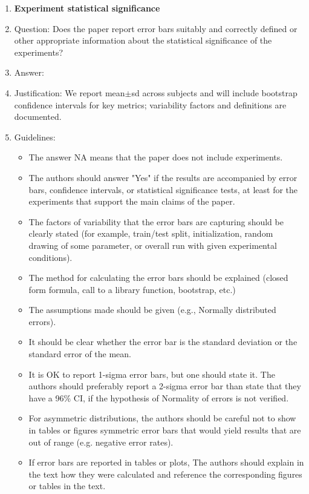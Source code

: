 \documentclass{article}
\begin{document}
\begin{enumerate}
\item {\bf Experiment statistical significance}
    \item[] Question: Does the paper report error bars suitably and correctly defined or other appropriate information about the statistical significance of the experiments?
    \item[] Answer: \answerYes{}
    \item[] Justification: We report mean$\pm$sd across subjects and will include bootstrap confidence intervals for key metrics; variability factors and definitions are documented.
    \item[] Guidelines:
    \begin{itemize}
        \item The answer NA means that the paper does not include experiments.
        \item The authors should answer "Yes" if the results are accompanied by error bars, confidence intervals, or statistical significance tests, at least for the experiments that support the main claims of the paper.
        \item The factors of variability that the error bars are capturing should be clearly stated (for example, train/test split, initialization, random drawing of some parameter, or overall run with given experimental conditions).
        \item The method for calculating the error bars should be explained (closed form formula, call to a library function, bootstrap, etc.)
        \item The assumptions made should be given (e.g., Normally distributed errors).
        \item It should be clear whether the error bar is the standard deviation or the standard error of the mean.
        \item It is OK to report 1-sigma error bars, but one should state it. The authors should preferably report a 2-sigma error bar than state that they have a 96\% CI, if the hypothesis of Normality of errors is not verified.
        \item For asymmetric distributions, the authors should be careful not to show in tables or figures symmetric error bars that would yield results that are out of range (e.g. negative error rates).
        \item If error bars are reported in tables or plots, The authors should explain in the text how they were calculated and reference the corresponding figures or tables in the text.
    \end{itemize}


\end{enumerate}
\end{document}
